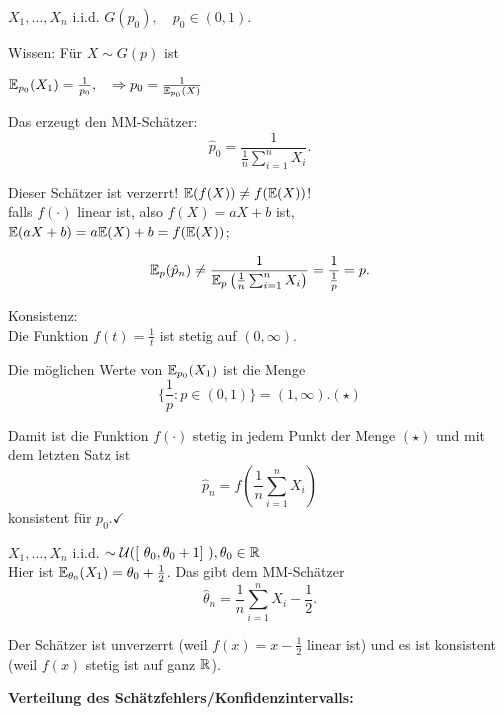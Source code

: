 \documentclass{tstextbook}
\begin{document}
\begin{example}
	$ X_1, \ldots, X_n $ i.i.d. $ G(p_0), \quad p_0 \in (0,1) $.
	
	Wissen: Für $ X \sim G(p) $ ist 
	
	$ \mathbb E_{p_0} (X_1) = \frac{1}{p_0}, \quad \Rightarrow p_0 = \frac{1}{\mathbb E_{p_0} (X)} $
	
	
	Das erzeugt den MM-Schätzer: 
	\[
	\hat{p}_0 = \frac{1}{\frac{1}{n} \sum_{i=1}^{n} X_i}.
	\]
	
	Dieser Schätzer ist verzerrt!
	$ \mathbb E(f(X)) \neq f(\mathbb E(X))$! \\
	falls $f(\cdot)$ linear ist, also  $f(X)= aX+b$ ist, $\mathbb E(aX+b)=a\mathbb E(X)+b=f(\mathbb E(X))$; 
	
	\[
	\begin{aligned}
		\mathbb E_p(\hat{p}_n) \ne \frac{1}{\mathbb E_p\left(\frac{1}{n}\sum_{i=1}^{n}X_i \right) } = \frac{1}{\frac{1}{p}} = p.
	\end{aligned}
	\]

	
	Konsistenz: \\
	
	Die Funktion $ f(t) = \frac{1}{t} $ ist stetig auf $ (0,\infty) $. 
	
	Die möglichen Werte von $ \mathbb E_{p_0}(X_1) $ ist die Menge \[ \lbrace \frac{1}{p} \colon  p\in (0,1) \rbrace = (1, \infty). (\star)  \]
	
	Damit ist die Funktion $f(\cdot)$ stetig in jedem Punkt der Menge $ (\star) $ und mit dem letzten Satz ist 
	\[  \hat{p}_n = f ( \frac{1}{n} \sum_{i=1}^{n} X_i) \] konsistent für  $ p_0 . \checkmark $

	
\end{example}
	
	
\begin{example}

	$ X_1 , \ldots, X_n $ i.i.d. $ \sim \mathcal{U} ( [\ \theta_0, \theta_0+1 ]\ ), \theta_0 \in \mathbb R $  \\
	
	Hier ist $\mathbb E_{\theta_0}(X_1)= \theta_0 + \frac{1}{2}$. Das gibt dem MM-Schätzer \[ \hat{\theta}_n=\frac{1}{n} \sum_{i=1}^{n}X_i - \frac{1}{2}. \]
	
	Der Schätzer ist unverzerrt (weil $f(x)=x-\frac{1}{2}$ linear ist) und es ist konsistent (weil $f(x)$ stetig ist auf ganz $\mathbb R$).	
	

\end{example}

\textbf{Verteilung des Schätzfehlers/Konfidenzintervalls:}
\end{document}
